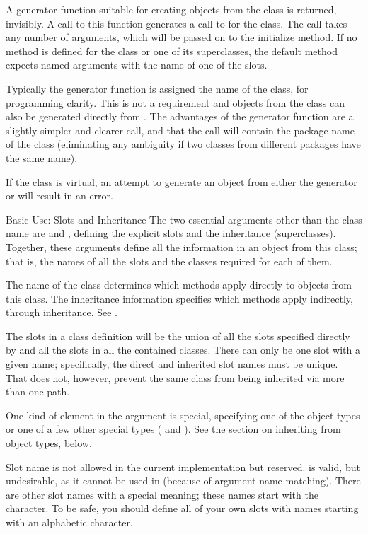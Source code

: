 %
\begin{Value}
A generator function suitable for creating objects from the class is
returned, invisibly.  A call to this function generates a call to
 for the class.  The call takes any number of arguments,
which will be passed on to the initialize method.  If no
 method is defined for the class or one of its
superclasses, the default method expects named arguments with the
name of one of the slots.

Typically the generator function is assigned the name of the class,
for programming clarity.  This is not a requirement and objects
from the class can also be generated directly from
.  The advantages of the generator function are a
slightly simpler and clearer call, and that the call will contain
the package name of the class (eliminating any ambiguity if two
classes from different packages have the same name).

If the class is virtual, an attempt to generate an object  from
either the generator or 
will result in an error.
\end{Value}
%
\begin{Section}{Basic Use: Slots and Inheritance}
The two essential arguments other than the class name are
 and , defining the explicit slots
and the inheritance (superclasses). Together, these arguments define
all the information in an object from this class; that is, the names
of all the slots and the classes required for each of them.

The name of the class determines
which methods apply directly to objects from this class.  The
inheritance information specifies which methods apply indirectly,
through inheritance.  See .

The slots in a class definition will be the union of all the slots
specified directly by  and all the slots in all
the contained classes.
There can only be one slot with a given name; specifically, the
direct and inherited slot names must be unique.
That does not, however, prevent the same class from being inherited
via more than one path.

One kind of element in the  argument is special, specifying one of the \R{}
object types or one of a few other special \R{} types ( and
).
See the section on inheriting from object types, below.


Slot name  is not allowed in the current implementation but
reserved.  is valid, but undesirable, as it cannot be
used in  (because of
argument name matching).
There are other slot names with a special meaning; these names start with
the  character.  To be safe, you should define all of
your own slots with names starting with an alphabetic character.
\end{Section}
